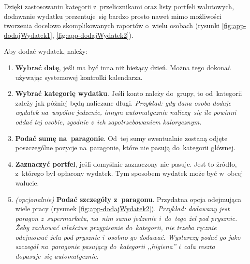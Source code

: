 \documentclass[12pt,a4paper,twoside,titlepage,openright]{book}
\begin{document}
Dzięki zastosowaniu kategorii z~przelicznikami oraz listy portfeli walutowych, dodawanie wydatku prezentuje~się bardzo prosto nawet mimo możliwości tworzenia docelowo skomplikowanych raportów o~wielu osobach (rysunki \ref{fig:app-dodajWydatek1}, \ref{fig:app-dodajWydatek2}).

Aby dodać wydatek, należy:

\begin{enumerate}
\item \textbf{Wybrać datę}, jeśli ma być inna niż bieżący dzień. Można tego dokonać używając systemowej kontrolki kalendarza.
\item \textbf{Wybrać kategorię wydatku}. Jeśli konto należy do~grupy, to od~kategorii zależy jak później będą naliczane długi. \textit{Przykład: gdy dana osoba dodaje wydatek na~wspólne jedzenie, innym automatycznie naliczy~się ile powinni oddać tej osobie, zgodnie z~ich zapotrzebowaniem kalorycznym.}
\item \textbf{Podać sumę na~paragonie}. Od~tej sumy ewentualnie zostaną odjęte poszczególne pozycje na~paragonie, które nie pasują do~kategorii głównej.
\item \textbf{Zaznaczyć portfel}, jeśli domyślnie zaznaczony nie pasuje. Jest to źródło, z~którego był opłacony wydatek. Tym sposobem wydatek może być w~obcej walucie.
\item \textit{(opcjonalnie)} \textbf{Podać szczegóły z~paragonu}. Przydatna opcja odejmująca wiele pracy (rysunek \ref{fig:app-dodajWydatek2}). \textit{Przykład: dodawany jest paragon z~supermarketu, na~nim samo jedzenie i~do~tego żel pod prysznic. Żeby zachować właściwe przypisanie do~kategorii, nie trzeba ręcznie odejmować żelu pod prysznic i~osobno go dodawać. Wystarczy podać go jako szczegół na~paragonie pasujący do~kategorii ,,higiena'' i~cała reszta dopasuje~się automatycznie.}
\end{enumerate}
\end{document}
